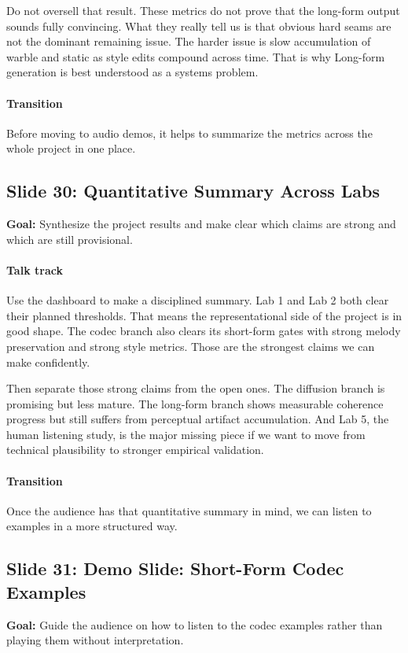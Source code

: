 \documentclass[11pt]{article}
\begin{document}
Do not oversell that result. These metrics do not prove that the long-form output sounds fully convincing. What they really tell us is that obvious hard seams are not the dominant remaining issue. The harder issue is slow accumulation of warble and static as style edits compound across time. That is why Long-form generation is best understood as a systems problem.

\paragraph{Transition}
Before moving to audio demos, it helps to summarize the metrics across the whole project in one place.

\subsection*{Slide 30: Quantitative Summary Across Labs}
\textbf{Goal:} Synthesize the project results and make clear which claims are strong and which are still provisional.
\paragraph{Talk track}
Use the dashboard to make a disciplined summary. Lab 1 and Lab 2 both clear their planned thresholds. That means the representational side of the project is in good shape. The codec branch also clears its short-form gates with strong melody preservation and strong style metrics. Those are the strongest claims we can make confidently.

Then separate those strong claims from the open ones. The diffusion branch is promising but less mature. The long-form branch shows measurable coherence progress but still suffers from perceptual artifact accumulation. And Lab 5, the human listening study, is the major missing piece if we want to move from technical plausibility to stronger empirical validation.

\paragraph{Transition}
Once the audience has that quantitative summary in mind, we can listen to examples in a more structured way.

\subsection*{Slide 31: Demo Slide: Short-Form Codec Examples}
\textbf{Goal:} Guide the audience on how to listen to the codec examples rather than playing them without interpretation.
\end{document}
